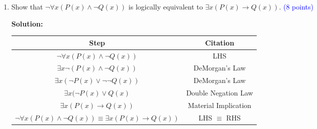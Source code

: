 \documentclass{article}
\newcommand{\pt}[1]{\textcolor{blue}{(#1 points)}}
\newenvironment{solution}
{
\par
\color{blue}
\textbf{Solution:}
}
{
\par
}
\begin{document}
\begin{enumerate}
    \vspace{2mm}
    \begin{solution}
    \begin{enumerate}
        \item $x = y = 1$
        \item No counterexample
        \item $x = y = 1$
    \end{enumerate}
    \end{solution}
    
    \item{Show that $\neg \forall x(P(x) \land \neg Q(x))$ is logically equivalent to $\exists x (P(x) \rightarrow Q(x))$}. \pt 8

    \vspace{2mm}
    \begin{solution}
    \begin{tabular}{c|c}
        Step & Citation \\
        \hline
        $\neg \forall x (P(x) \land \neg Q(x))$ & LHS \\
        $\exists x \neg (P(x) \land \neg Q(x))$ & DeMorgan's Law \\
        $\exists x (\neg P(x) \lor \neg \neg Q(x))$ & DeMorgan's Law \\
        $\exists x (\neg P(x) \lor Q(x)$ & Double Negation Law \\
        $\exists x (P(x) \rightarrow Q(x))$ & Material Implication \\
        $\neg \forall x (P(x) \land \neg Q(x)) \equiv \exists x (P(x) \rightarrow Q(x))$ & LHS $\equiv$ RHS \\
    \end{tabular}
    \end{solution}
    
    
\end{enumerate}
\end{document}
